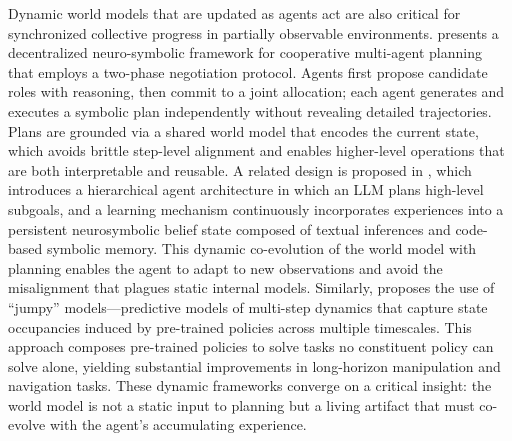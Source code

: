 \documentclass[11pt]{article}
\begin{document}
Dynamic world models that are updated as agents act are also critical for synchronized collective progress in partially observable environments. \cite{ref193} presents a decentralized neuro-symbolic framework for cooperative multi-agent planning that employs a two-phase negotiation protocol. Agents first propose candidate roles with reasoning, then commit to a joint allocation; each agent generates and executes a symbolic plan independently without revealing detailed trajectories. Plans are grounded via a shared world model that encodes the current state, which avoids brittle step-level alignment and enables higher-level operations that are both interpretable and reusable. A related design is proposed in \cite{ref194}, which introduces a hierarchical agent architecture in which an LLM plans high-level subgoals, and a learning mechanism continuously incorporates experiences into a persistent neurosymbolic belief state composed of textual inferences and code-based symbolic memory. This dynamic co-evolution of the world model with planning enables the agent to adapt to new observations and avoid the misalignment that plagues static internal models. Similarly, \cite{ref195} proposes the use of ``jumpy'' models---predictive models of multi-step dynamics that capture state occupancies induced by pre-trained policies across multiple timescales. This approach composes pre-trained policies to solve tasks no constituent policy can solve alone, yielding substantial improvements in long-horizon manipulation and navigation tasks. These dynamic frameworks converge on a critical insight: the world model is not a static input to planning but a living artifact that must co-evolve with the agent's accumulating experience.
\end{document}
